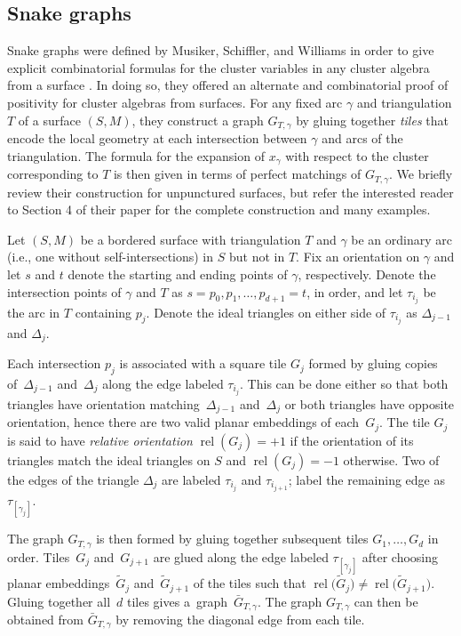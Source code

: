 \documentclass[11pt]{article}
\numberwithin{equation}{section}
\begin{document}
\subsection{Snake graphs}\label{section:snakeGraphs}

Snake graphs were defined by Musiker, Schiffler, and Williams in order to give explicit combinatorial formulas for the cluster variables in any cluster algebra from a surface \cite{MSW}. In doing so, they offered an alternate and combinatorial proof of positivity for cluster algebras from surfaces. For any fixed arc $\gamma$ and triangulation $T$ of a surface $(S,M)$, they construct a graph $G_{T,\gamma}$ by gluing together \emph{tiles} that encode the local geometry at each intersection between $\gamma$ and arcs of the triangulation. The formula for the expansion of $x_\gamma$ with respect to the cluster corresponding to $T$ is then given in terms of perfect matchings of $G_{T,\gamma}$. We briefly review their construction for unpunctured surfaces, but refer the interested reader to Section 4 of their paper for the complete construction and many examples.

Let $(S,M)$ be a bordered surface with triangulation $T$ and $\gamma$ be an ordinary arc (i.e., one without self-intersections) in $S$ but not in $T$. Fix an orientation on $\gamma$ and let $s$ and $t$ denote the starting and ending points of $\gamma$, respectively. Denote the intersection points of $\gamma$ and $T$ as $s = p_0, p_1, \dots, p_{d+1} = t$, in order, and let $\tau_{i_j}$ be the arc in $T$ containing $p_j$. Denote the ideal triangles on either side of $\tau_{i_j}$ as $\Delta_{j-1}$ and $\Delta_j$.

Each intersection $p_j$ is associated with a square tile $G_j$ formed by gluing copies of~$\Delta_{j-1}$ and~$\Delta_j$ along the edge labeled $\tau_{i_j}$. This can be done either so that both triangles have orientation matching~$\Delta_{j-1}$ and~$\Delta_j$ or both triangles have opposite orientation, hence there are two valid planar embeddings of each~$G_j$. The tile $G_j$ is said to have \emph{relative orientation} $\operatorname{rel}(G_j) = +1$ if the orientation of its triangles match the ideal triangles on $S$ and $\operatorname{rel}(G_j) = -1$ otherwise. Two of the edges of the triangle $\Delta_j$ are labeled $\tau_{i_j}$ and $\tau_{i_{j+1}}$; label the remaining edge as $\tau_{[\gamma_j]}$.

{\sloppy The graph $G_{T,\gamma}$ is then formed by gluing together subsequent tiles $G_{1}, \dots, G_{d}$ in order. Ti\-les~$G_j$ and~$G_{j+1}$ are glued along the edge labeled $\tau_{[\gamma_j]}$ after choosing planar embeddings~$\widetilde{G}_j$ and~$\widetilde{G}_{j+1}$ of the tiles such that $\operatorname{rel}\big(\widetilde{G}_j\big) \neq \operatorname{rel}\big(\widetilde{G}_{j+1}\big)$. Gluing together all~$d$ tiles gives a~graph~$\bar{G}_{T,\gamma}$. The graph $G_{T,\gamma}$ can then be obtained from $\bar{G}_{T,\gamma}$ by removing the diagonal edge from each tile.

}
\end{document}
